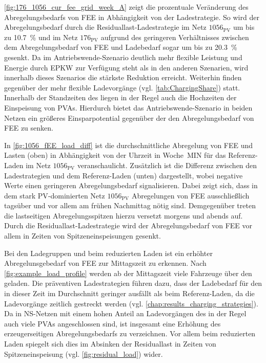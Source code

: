 

\autoref{fig:176_1056_cur_fee_grid_week_A} zeigt die prozentuale Veränderung des Abregelungsbedarfs von \gls{FEE} in Abhängigkeit von der Ladestrategie.
So wird der Abregelungsbedarf durch die Residuallast-Ladestrategie im Netz \(1056_{\text{PV}}\) um bis zu \SI{10.7}{\percent} und im Netz \(176_{\text{PV}}\) aufgrund des geringeren Verhältnisses zwischen dem Abregelungsbedarf von \gls{FEE} und Ladebedarf sogar um bis zu \SI{20.3}{\percent} gesenkt.
Da im Antriebswende-Szenario deutlich mehr flexible Leistung und Energie durch \gls{EPKW} zur Verfügung steht als in den anderen Szenarien, wird innerhalb dieses Szenarios die stärkste Reduktion erreicht.
Weiterhin finden gegenüber der \SzeFirmenparkplatz mehr flexible Ladevorgänge (vgl. \autoref{tab:ChargingShare}) statt.
Innerhalb der Standzeiten des \UC \Firmeparkplatz liegen in der Regel auch die Hochzeiten der Einspeisung von \glspl{PVA}.
Hierdurch bietet das Antriebswende-Szenario in beiden Netzen ein größeres Einsparpotential gegenüber der \SzeFirmenparkplatz den Abregelungsbedarf von \gls{FEE} zu senken.



In \autoref{fig:1056_fEE_load_diff} ist die durchschnittliche Abregelung von \gls{FEE} und Lasten (oben) in Abhängigkeit von der Uhrzeit in Woche~MIN für das Referenz-Laden im Netz \(1056_{\text{PV}}\) veranschaulicht.
Zusätzlich ist die Differenz zwischen den Ladestrategien und dem Referenz-Laden (unten) dargestellt, wobei negative Werte einen geringeren Abregelungsbedarf signalisieren.
Dabei zeigt sich, dass in dem stark \gls{PV}-dominierten Netz \(1056_{\text{PV}}\) Abregelungen von \gls{FEE} ausschließlich tagsüber und vor allem am frühen Nachmittag nötig sind.
Demgegenüber treten die lastseitigen Abregelungsspitzen hierzu versetzt morgens und abends auf.
Durch die Residuallast-Ladestrategie wird der Abregelungsbedarf von \gls{FEE} vor allem in Zeiten von Spitzeneinspeisungen gesenkt.\medskip

Bei den Ladegruppen und beim reduzierten Laden ist ein erhöhter Abregelunsgebedarf von \gls{FEE} zur Mittagszeit zu erkennen.
Nach \autoref{fig:example_load_profile} werden ab der Mittagszeit viele Fahrzeuge über den \UC \zH geladen.
Die präventiven Ladestrategien führen dazu, dass der Ladebedarf für den \UC \zH in dieser Zeit im Durchschnitt geringer ausfällt als beim Referenz-Laden, da die Ladevorgänge zeitlich gestreckt werden (vgl. \autoref{chap:results_charging_strategies}).
Da in \gls{NS}-Netzen mit einem hohen Anteil an Ladevorgängen des \UC \zH in der Regel auch viele \glspl{PVA} angeschlossen sind, ist insgesamt eine Erhöhung des erzeugerseitigen Abregelungsbedarfs zu verzeichnen.
Vor allem beim reduzierten Laden spiegelt sich dies im Absinken der Residuallast in Zeiten von Spitzeneinspeisung (vgl. \autoref{fig:residual_load}) wider.

